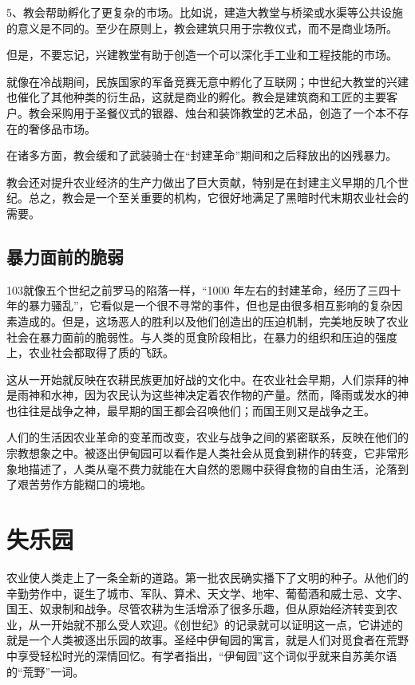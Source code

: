 5、教会帮助孵化了更复杂的市场。比如说，建造大教堂与桥梁或水渠等公共设施的意义是不同的。至少在原则上，教会建筑只用于宗教仪式，而不是商业场所。

但是，不要忘记，兴建教堂有助于创造一个可以深化手工业和工程技能的市场。

就像在冷战期间，民族国家的军备竞赛无意中孵化了互联网；中世纪大教堂的兴建也催化了其他种类的衍生品，这就是商业的孵化。教会是建筑商和工匠的主要客户。教会采购用于圣餐仪式的银器、烛台和装饰教堂的艺术品，创造了一个本不存在的奢侈品市场。

在诸多方面，教会缓和了武装骑士在“封建革命”期间和之后释放出的凶残暴力。

教会还对提升农业经济的生产力做出了巨大贡献，特别是在封建主义早期的几个世纪。总之，教会是一个至关重要的机构，它很好地满足了黑暗时代末期农业社会的需要。

\subsection{暴力面前的脆弱}
103就像五个世纪之前罗马的陷落一样，“1000 年左右的封建革命，经历了三四十年的暴力骚乱”，它看似是一个很不寻常的事件，但也是由很多相互影响的复杂因素造成的。但是，这场恶人的胜利以及他们创造出的压迫机制，完美地反映了农业社会在暴力面前的脆弱性。与人类的觅食阶段相比，在暴力的组织和压迫的强度上，农业社会都取得了质的飞跃。

这从一开始就反映在农耕民族更加好战的文化中。在农业社会早期，人们崇拜的神是雨神和水神，因为农民认为这些神决定着农作物的产量。然而，降雨或发水的神也往往是战争之神，最早期的国王都会召唤他们；而国王则又是战争之王。

人们的生活因农业革命的变革而改变，农业与战争之间的紧密联系，反映在他们的宗教想象之中。被逐出伊甸园可以看作是人类社会从觅食到耕作的转变，它非常形象地描述了，人类从毫不费力就能在大自然的恩赐中获得食物的自由生活，沦落到了艰苦劳作方能糊口的境地。

\section{失乐园}
农业使人类走上了一条全新的道路。第一批农民确实播下了文明的种子。从他们的辛勤劳作中，诞生了城市、军队、算术、天文学、地牢、葡萄酒和威士忌、文字、国王、奴隶制和战争。尽管农耕为生活增添了很多乐趣，但从原始经济转变到农业，从一开始就不那么受人欢迎。《创世纪》的记录就可以证明这一点，它讲述的就是一个人类被逐出乐园的故事。圣经中伊甸园的寓言，就是人们对觅食者在荒野中享受轻松时光的深情回忆。有学者指出，“伊甸园”这个词似乎就来自苏美尔语的“荒野”一词。

